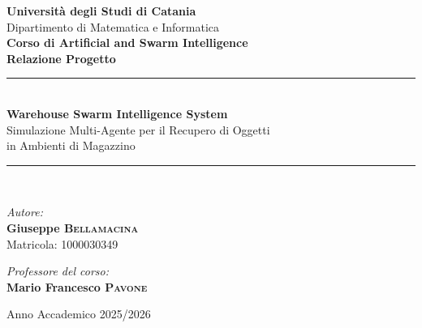 \begin{titlepage}
    \centering
    \vspace*{2cm}

    {\LARGE \textbf{Universit\`a degli Studi di Catania}}\\[0.5cm]
    {\large Dipartimento di Matematica e Informatica}\\[2.5cm]
    {\Large \textbf{Corso di Artificial and Swarm Intelligence}}\\[0.3cm]
    {\Large \textbf{Relazione Progetto}}\\[2cm]

    \rule{\linewidth}{0.5mm}\\[0.4cm]
    {\huge \bfseries Warehouse Swarm Intelligence System}\\[0.2cm]
    {\Large Simulazione Multi-Agente per il Recupero di Oggetti\\in Ambienti di Magazzino}\\[0.4cm]
    \rule{\linewidth}{0.5mm}\\[3cm]

    \vfill

    \begin{minipage}{0.4\textwidth}
        \begin{flushleft}
            \large
            \textit{Autore:}\\
            \textbf{Giuseppe \textsc{Bellamacina}}\\
            Matricola: 1000030349
        \end{flushleft}
    \end{minipage}
    \hfill
    \begin{minipage}{0.4\textwidth}
        \begin{flushright}
            \large
            \textit{Professore del corso:}\\
            \textbf{Mario Francesco \textsc{Pavone}}\\
        \end{flushright}
    \end{minipage}

    \vspace{2cm}

    {\large Anno Accademico 2025/2026}
\end{titlepage}
